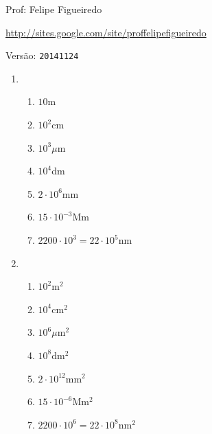 \documentclass[a4paper]{article}
\begin{document}
\parbox[c]{.825\textwidth}{\raggedright%
{Prof: Felipe Figueiredo\par}
{\url{http://sites.google.com/site/proffelipefigueiredo}}
}

Versão: \verb|20141124|



\begin{enumerate}
\item %
  \begin{enumerate}
  \item $10$m %
  \item $10^2$cm %
  \item $10^3\mu$m %
  \item $10^4$dm %
  \item $2\cdot 10^6$mm %
  \item $15\cdot 10^{-3}$Mm %
  \item $2200 \cdot 10^3 = 22 \cdot 10^5$nm %
  \end{enumerate}
\item %
  \begin{enumerate}
  \item $10^2$m$^2$ %
  \item $10^4$cm$^2$ %
  \item $10^6\mu$m$^2$ %
  \item $10^8$dm$^2$ %
  \item $2\cdot 10^{12}$mm$^2$ %
  \item $15\cdot 10^{-6}$Mm$^2$ %
  \item $2200 \cdot 10^6 = 22 \cdot 10^8$nm$^2$ %
  \end{enumerate}


\end{enumerate}
\end{document}
